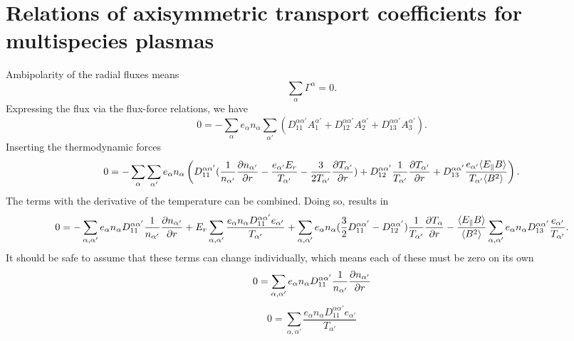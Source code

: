 \section{Relations of axisymmetric transport coefficients for multispecies plasmas}
Ambipolarity of the radial fluxes means
\begin{equation}
  \sum_{\alpha} \Gamma^{\alpha} = 0.
\end{equation}
Expressing the flux via the flux-force relations, we have
\begin{equation}
  0 = - \sum_{\alpha} e_{\alpha} n_{\alpha} \sum_{\alpha'} \left( D_{11}^{\alpha\alpha'} A_{1}^{\alpha'} + D_{12}^{\alpha\alpha'} A_{2}^{\alpha'} + D_{13}^{\alpha\alpha'} A_{3}^{\alpha'}\right).
\end{equation}
Inserting the thermodynamic forces
\begin{equation}
  0 = - \sum_{\alpha} \sum_{\alpha'} e_{\alpha} n_{\alpha} \left( D_{11}^{\alpha\alpha'} (\frac{1}{n_{\alpha'}} \frac{\partial n_{\alpha'}}{\partial r} - \frac{e_{\alpha'} E_r}{T_{\alpha'}} - \frac{3}{2 T_{\alpha'}} \frac{\partial T_{\alpha'}}{\partial r})
    + D_{12}^{\alpha\alpha'} \frac{1}{T_{\alpha'}} \frac{\partial T_{\alpha'}}{\partial r} + D_{13}^{\alpha\alpha'} \frac{e_{\alpha'} \langle E_{\parallel} B \rangle}{T_{\alpha'} \langle B^2 \rangle} \right).
\end{equation}
The terms with the derivative of the temperature can be combined. Doing
so, results in
\begin{equation}
  0 = - \sum_{\alpha, \alpha'} e_{\alpha} n_{\alpha} D_{11}^{\alpha\alpha'} \frac{1}{n_{\alpha'}} \frac{\partial n_{\alpha'}}{\partial r}
      + E_r \sum_{\alpha, \alpha'} \frac{e_{\alpha} n_{\alpha} D_{11}^{\alpha\alpha'} e_{\alpha'}}{T_{\alpha'}}
      + \sum_{\alpha, \alpha'} e_{\alpha} n_{\alpha} (\frac{3}{2} D_{11}^{\alpha\alpha'} - D_{12}^{\alpha\alpha'}) \frac{1}{T_{\alpha'}} \frac{\partial T_{\alpha}}{\partial r}
      - \frac{\langle E_{\parallel} B \rangle}{\langle B^2 \rangle} \sum_{\alpha, \alpha'} e_{\alpha} n_{\alpha} D_{13}^{\alpha\alpha'} \frac{e_{\alpha'}}{T_{\alpha'}}.
\end{equation}
It should be safe to assume that these terms can change individually,
which means each of these must be zero on its own
\begin{equation}
  0 = \sum_{\alpha, \alpha'} e_{\alpha} n_{\alpha} D_{11}^{\alpha\alpha'} \frac{1}{n_{\alpha'}} \frac{\partial n_{\alpha'}}{\partial r}
\end{equation}
\begin{equation}
  0 = \sum_{\alpha, \alpha'} \frac{e_{\alpha} n_{\alpha} D_{11}^{\alpha\alpha'} e_{\alpha'}}{T_{\alpha'}}\label{eq_ambipolarity_condition_from_radial_electric_field}
\end{equation}
